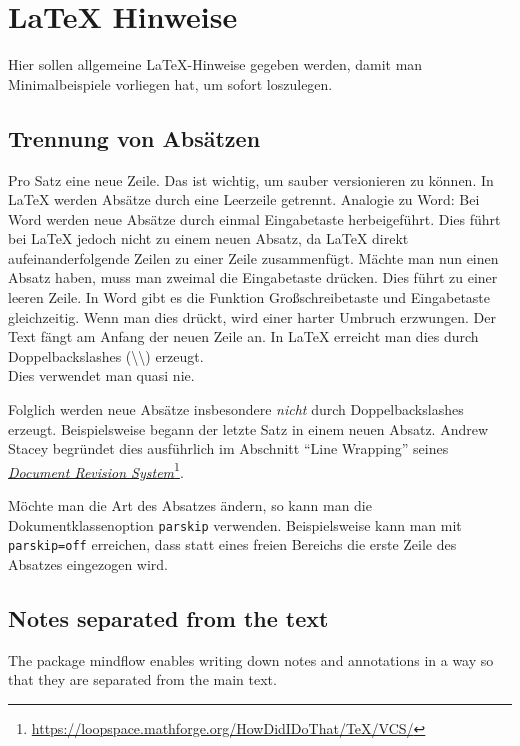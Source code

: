 \chapter{LaTeX Hinweise}
\label{sec:latexhints}

Hier sollen allgemeine \LaTeX-Hinweise gegeben werden, damit man Minimalbeispiele vorliegen hat, um sofort loszulegen.

\section{Trennung von Absätzen}

\begin{ltgexample}
Pro Satz eine neue Zeile.
Das ist wichtig, um sauber versionieren zu können.
In LaTeX werden Absätze durch eine Leerzeile getrennt.
Analogie zu Word: Bei Word werden neue Absätze durch einmal Eingabetaste herbeigeführt.
Dies führt bei LaTeX jedoch nicht zu einem neuen Absatz, da LaTeX direkt aufeinanderfolgende Zeilen zu einer Zeile zusammenfügt.
Mächte man nun einen Absatz haben, muss man zweimal die Eingabetaste drücken.
Dies führt zu einer leeren Zeile.
In Word gibt es die Funktion Großschreibetaste und Eingabetaste gleichzeitig.
Wenn man dies drückt, wird einer harter Umbruch erzwungen.
Der Text fängt am Anfang der neuen Zeile an.
In LaTeX erreicht man dies durch Doppelbackslashes (\textbackslash\textbackslash) erzeugt.
\\
Dies verwendet man quasi nie.

Folglich werden neue Absätze insbesondere \emph{nicht} durch Doppelbackslashes erzeugt.
Beispielsweise begann der letzte Satz in einem neuen Absatz.
Andrew Stacey begründet dies ausführlich im Abschnitt \enquote{Line Wrapping} seines \href{https://loopspace.mathforge.org/HowDidIDoThat/TeX/VCS/#section.3}{\emph{Document Revision System}}\footnote{\url{https://loopspace.mathforge.org/HowDidIDoThat/TeX/VCS/}}.
\end{ltgexample}

Möchte man die Art des Absatzes ändern, so kann man die Dokumentklassenoption \texttt{parskip} verwenden.
Beispielsweise kann man mit \texttt{parskip=off} erreichen, dass statt eines freien Bereichs die erste Zeile des Absatzes eingezogen wird.

\section{Notes separated from the text}

The package mindflow enables writing down notes and annotations in a way so that they are separated from the main text.

